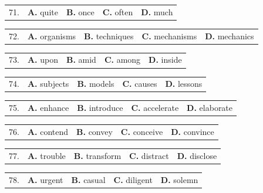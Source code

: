 \documentclass[UTF8,11pt]{ctexart}
\begin{document}
\noindent\begin{tabularx}{\linewidth}{@{}lXXXX@{}}71. & \textbf{A.} quite & \textbf{B.} once & \textbf{C.} often & \textbf{D.} much\\\end{tabularx}\par

\noindent\begin{tabularx}{\linewidth}{@{}lXXXX@{}}72. & \textbf{A.} organisms & \textbf{B.} techniques & \textbf{C.} mechanisms & \textbf{D.} mechanics\\\end{tabularx}\par

\noindent\begin{tabularx}{\linewidth}{@{}lXXXX@{}}73. & \textbf{A.} upon & \textbf{B.} amid & \textbf{C.} among & \textbf{D.} inside\\\end{tabularx}\par

\noindent\begin{tabularx}{\linewidth}{@{}lXXXX@{}}74. & \textbf{A.} subjects & \textbf{B.} models & \textbf{C.} causes & \textbf{D.} lessons\\\end{tabularx}\par

\noindent\begin{tabularx}{\linewidth}{@{}lXXXX@{}}75. & \textbf{A.} enhance & \textbf{B.} introduce & \textbf{C.} accelerate & \textbf{D.} elaborate\\\end{tabularx}\par

\noindent\begin{tabularx}{\linewidth}{@{}lXXXX@{}}76. & \textbf{A.} contend & \textbf{B.} convey & \textbf{C.} conceive & \textbf{D.} convince\\\end{tabularx}\par

\noindent\begin{tabularx}{\linewidth}{@{}lXXXX@{}}77. & \textbf{A.} trouble & \textbf{B.} transform & \textbf{C.} distract & \textbf{D.} disclose\\\end{tabularx}\par

\noindent\begin{tabularx}{\linewidth}{@{}lXXXX@{}}78. & \textbf{A.} urgent & \textbf{B.} casual & \textbf{C.} diligent & \textbf{D.} solemn\\\end{tabularx}\par
\end{document}
